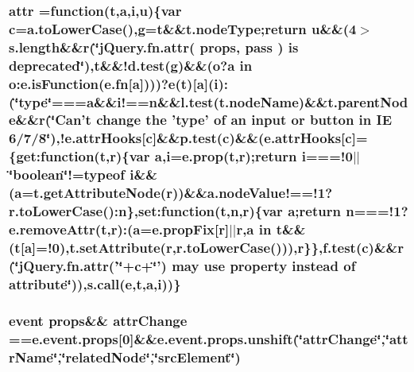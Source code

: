 \hypertarget{jquery-migrate-1_82_81_8min_8js_a571977117149de472ef2f4cd0087bc92}{
\subsubsection[{attr}]{ attr =function({\bf t},{\bf a},{\bf i},{\bf u})\{var {\bf c}=a.\-to\-Lower\-Case(),{\bf g}={\bf t}\&\&t.\-node\-Type;return {\bf u}\&\&(4$>$s.\-length\&\&{\bf r}(\char`\"{}j\-Query.\-fn.\-attr( props, pass ) is deprecated\char`\"{}),t\&\&!d.\-test({\bf g})\&\&({\bf o}?{\bf a} in o\-:e.\-is\-Function({\bf e.\-fn}\mbox{[}{\bf a}\mbox{]})))?{\bf e}({\bf t})\mbox{[}{\bf a}\mbox{]}({\bf i})\-:(\char`\"{}type\char`\"{}===a\&\&i!=={\bf n}\&\&l.\-test(t.\-node\-Name)\&\&t.\-parent\-Node\&\&{\bf r}(\char`\"{}Can'{\bf t} change the 'type' of {\bf an} input or {\bf button} in I\-E 6/7/8\char`\"{}),!e.\-attr\-Hooks\mbox{[}{\bf c}\mbox{]}\&\&p.\-test({\bf c})\&\&(e.\-attr\-Hooks\mbox{[}{\bf c}\mbox{]}=\{get\-:function({\bf t},{\bf r})\{var {\bf a},{\bf i}=e.\-prop({\bf t},{\bf r});return {\bf i}===!0$\vert$$\vert$\char`\"{}boolean\char`\"{}!=typeof {\bf i}\&\&({\bf a}=t.\-get\-Attribute\-Node({\bf r}))\&\&a.\-node\-Value!==!1?r.\-to\-Lower\-Case()\-:{\bf n}\},set\-:function({\bf t},{\bf n},{\bf r})\{var {\bf a};return {\bf n}===!1?e.\-remove\-Attr({\bf t},{\bf r})\-:({\bf a}=e.\-prop\-Fix\mbox{[}{\bf r}\mbox{]}$\vert$$\vert${\bf r},{\bf a} in {\bf t}\&\&({\bf t}\mbox{[}{\bf a}\mbox{]}=!0),t.\-set\-Attribute({\bf r},r.\-to\-Lower\-Case())),{\bf r}\}\},f.\-test({\bf c})\&\&{\bf r}(\char`\"{}j\-Query.\-fn.\-attr('\char`\"{}+c+\char`\"{}') may use property instead of attribute\char`\"{})),s.\-call({\bf e},{\bf t},{\bf a},{\bf i}))\}}}\label{jquery-migrate-1_82_81_8min_8js_a571977117149de472ef2f4cd0087bc92}
\hypertarget{jquery-migrate-1_82_81_8min_8js_a68b4be885a1e4895f79417999469377d}{
\subsubsection[{attr\-Change}]{ event props\&\& attr\-Change ==e.\-event.\-props\mbox{[}0\mbox{]}\&\&e.\-event.\-props.\-unshift(\char`\"{}attr\-Change\char`\"{},\char`\"{}attr\-Name\char`\"{},\char`\"{}related\-Node\char`\"{},\char`\"{}src\-Element\char`\"{})}}\label{jquery-migrate-1_82_81_8min_8js_a68b4be885a1e4895f79417999469377d}
